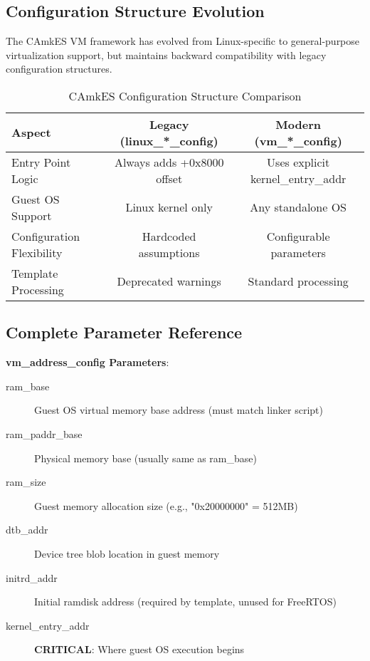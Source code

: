 \documentclass[12pt]{article}
\begin{document}
\subsection{Configuration Structure Evolution}

The CAmkES VM framework has evolved from Linux-specific to general-purpose virtualization support, but maintains backward compatibility with legacy configuration structures.

\begin{table}[h!]
\centering
\begin{tabular}{@{}lcc@{}}
\toprule
\textbf{Aspect} & \textbf{Legacy (linux\_*\_config)} & \textbf{Modern (vm\_*\_config)} \\
\midrule
Entry Point Logic & Always adds +0x8000 offset & Uses explicit kernel\_entry\_addr \\
Guest OS Support & Linux kernel only & Any standalone OS \\
Configuration Flexibility & Hardcoded assumptions & Configurable parameters \\
Template Processing & Deprecated warnings & Standard processing \\
\bottomrule
\end{tabular}
\caption{CAmkES Configuration Structure Comparison}
\end{table}

\subsection{Complete Parameter Reference}

\textbf{vm\_address\_config Parameters}:
\begin{description}
\item[ram\_base] Guest OS virtual memory base address (must match linker script)
\item[ram\_paddr\_base] Physical memory base (usually same as ram\_base)
\item[ram\_size] Guest memory allocation size (e.g., "0x20000000" = 512MB)
\item[dtb\_addr] Device tree blob location in guest memory
\item[initrd\_addr] Initial ramdisk address (required by template, unused for FreeRTOS)
\item[kernel\_entry\_addr] \textbf{CRITICAL}: Where guest OS execution begins
\end{description}
\end{document}
